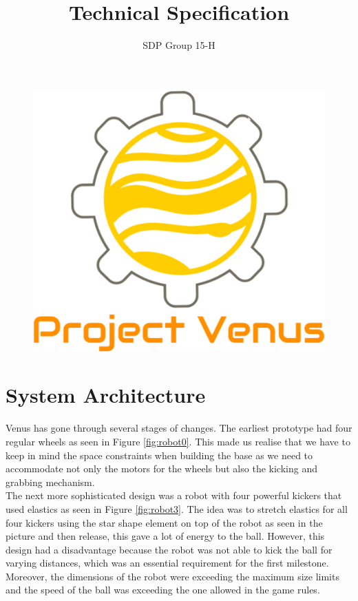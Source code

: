 \documentclass[12pt]{article}
\title{Technical Specification}
\author{SDP Group 15-H}
\begin{document}
\begin{figure}
    \vspace*{-3em}
    \centering
    \includegraphics[scale=.18]{logo.png}
\end{figure}

\setlength{\droptitle}{-4em}
\maketitle

\section{System Architecture}

Venus has gone through several stages of changes. The earliest prototype had four regular wheels as seen in Figure \ref{fig:robot0}. This made us realise that we have to keep in mind the space
constraints when building the base as we need to accommodate not only the motors
for the wheels but also the kicking and grabbing mechanism. 
\\The next more sophisticated design was a robot with four powerful kickers that used elastics as seen in Figure \ref{fig:robot3}. The idea was to stretch elastics for all four kickers using the star shape element on top of the robot as seen in the picture and then release, this gave a lot of energy to the ball. However, this design had a disadvantage because the robot was not able to kick the ball for varying distances, which was an essential requirement for the first milestone. Moreover, the dimensions of the robot were exceeding the maximum size limits and the speed of the ball was exceeding the one allowed in the game rules. 
\end{document}
